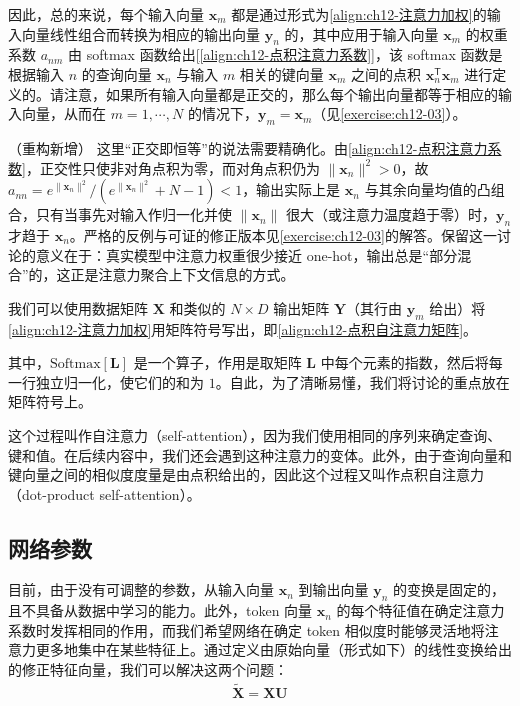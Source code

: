 \documentclass[../../main.tex]{subfiles}
\begin{document}
因此，总的来说，每个输入向量 $\mathbf{x}_m$ 都是通过形式为\eqref{align:ch12-注意力加权}的输入向量线性组合而转换为相应的输出向量 $\mathbf{y}_n$ 的，其中应用于输入向量 $\mathbf{x}_m$ 的权重系数 $a_{nm}$ 由 softmax 函数给出[\eqref{align:ch12-点积注意力系数}]，该 softmax 函数是根据输入 $n$ 的查询向量 $\mathbf{x}_n$ 与输入 $m$ 相关的键向量 $\mathbf{x}_m$ 之间的点积 $\mathbf{x}_n^{\mathsf{T}}\mathbf{x}_m$ 进行定义的。请注意，如果所有输入向量都是正交的，那么每个输出向量都等于相应的输入向量，从而在 $m=1,\cdots,N$ 的情况下，$\mathbf{y}_m=\mathbf{x}_m$（见\cref{exercise:ch12-03}）。

\begin{remark}（重构新增）
这里“正交即恒等”的说法需要精确化。由\eqref{align:ch12-点积注意力系数}，正交性只使非对角点积为零，而对角点积仍为 $\|\mathbf{x}_n\|^{2}>0$，故 $a_{nn}=e^{\|\mathbf{x}_n\|^{2}}\big/\left(e^{\|\mathbf{x}_n\|^{2}}+N-1\right)<1$，输出实际上是 $\mathbf{x}_n$ 与其余向量均值的凸组合，只有当事先对输入作归一化并使 $\|\mathbf{x}_n\|$ 很大（或注意力温度趋于零）时，$\mathbf{y}_n$ 才趋于 $\mathbf{x}_n$。严格的反例与可证的修正版本见\cref{exercise:ch12-03}的解答。保留这一讨论的意义在于：真实模型中注意力权重很少接近 one-hot，输出总是“部分混合”的，这正是注意力聚合上下文信息的方式。
\end{remark}

我们可以使用数据矩阵 $\mathbf{X}$ 和类似的 $N\times D$ 输出矩阵 $\mathbf{Y}$（其行由 $\mathbf{y}_m$ 给出）将\eqref{align:ch12-注意力加权}用矩阵符号写出，即\eqref{align:ch12-点积自注意力矩阵}。

其中，$\mathrm{Softmax}[\mathbf{L}]$ 是一个算子，作用是取矩阵 $\mathbf{L}$ 中每个元素的指数，然后将每一行独立归一化，使它们的和为 $1$。自此，为了清晰易懂，我们将讨论的重点放在矩阵符号上。

这个过程叫作自注意力（self-attention），因为我们使用相同的序列来确定查询、键和值。在后续内容中，我们还会遇到这种注意力的变体。此外，由于查询向量和键向量之间的相似度度量是由点积给出的，因此这个过程又叫作点积自注意力（dot-product self-attention）。

\subsection{网络参数}\label{subsection:ch12-网络参数}

目前，由于没有可调整的参数，从输入向量 $\mathbf{x}_n$ 到输出向量 $\mathbf{y}_n$ 的变换是固定的，且不具备从数据中学习的能力。此外，token 向量 $\mathbf{x}_n$ 的每个特征值在确定注意力系数时发挥相同的作用，而我们希望网络在确定 token 相似度时能够灵活地将注意力更多地集中在某些特征上。通过定义由原始向量（形式如下）的线性变换给出的修正特征向量，我们可以解决这两个问题：
\begin{align}
\tilde{\mathbf{X}}=\mathbf{X}\mathbf{U}
\label{align:ch12-特征线性变换}
\end{align}
\end{document}
